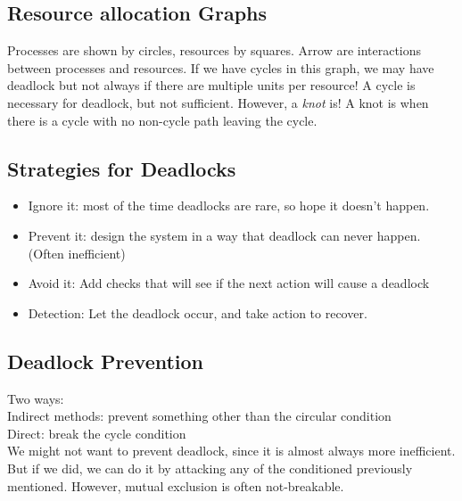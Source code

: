 \documentclass[12pt]{article}
\theoremstyle{definition}
\begin{document}
\subsection{Resource allocation Graphs}
Processes are shown by circles, resources by squares. Arrow are interactions between processes and resources. If we have cycles in this graph, we may have deadlock but not always if there are multiple units per resource! A cycle is necessary for deadlock, but not sufficient. However, a \textit{knot} is! A knot is when there is a cycle with no non-cycle path leaving the cycle.
\\ \linebreak

\subsection{Strategies for Deadlocks}
\begin{itemize}
	\item Ignore it: most of the time deadlocks are rare, so hope it doesn't happen.
	\item Prevent it: design the system in a way that deadlock can never happen. (Often inefficient)
	\item Avoid it: Add checks that will see if the next action will cause a deadlock
	\item Detection: Let the deadlock occur, and take action to recover.
\end{itemize}

\subsection{Deadlock Prevention}
Two ways:
\\ \linebreak
Indirect methods: prevent something other than the circular condition
\\ \linebreak
Direct: break the cycle condition
\\ \linebreak
We might not want to prevent deadlock, since it is almost always more inefficient. But if we did, we can do it by attacking any of the conditioned previously mentioned. However, mutual exclusion is often not-breakable.
\end{document}
